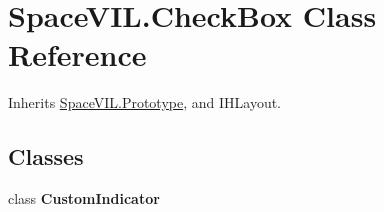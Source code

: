 \hypertarget{class_space_v_i_l_1_1_check_box}{}\section{Space\+V\+I\+L.\+Check\+Box Class Reference}
\label{class_space_v_i_l_1_1_check_box}


Inherits \mbox{\hyperlink{class_space_v_i_l_1_1_prototype}{Space\+V\+I\+L.\+Prototype}}, and I\+H\+Layout.

\subsection*{Classes}
\begin{DoxyCompactItemize}
\item 
class {\bfseries Custom\+Indicator}
\end{DoxyCompactItemize}
